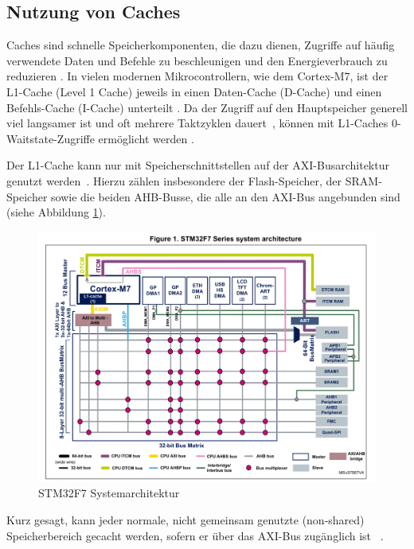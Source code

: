 \newpage


\subsection{Nutzung von Caches}

Caches sind schnelle Speicherkomponenten, die dazu dienen, Zugriffe auf häufig
verwendete Daten und Befehle zu beschleunigen und den Energieverbrauch zu
reduzieren \cite{ka001150}. In vielen modernen Mikrocontrollern, wie dem
Cortex-M7, ist der L1-Cache (Level 1 Cache) jeweils in einen Daten-Cache
(D-Cache) und einen Befehls-Cache (I-Cache) unterteilt \cite[S. 6]{an4667}. Da
der Zugriff auf den Hauptspeicher generell viel langsamer ist und oft mehrere
Taktzyklen dauert~\cite{stm32_memory_sections}, können mit L1-Caches
0-Waitstate-Zugriffe ermöglicht werden \cite[S. 6]{an4667}.

Der L1-Cache kann nur mit Speicherschnittstellen auf der \ac{AXI}-Busarchitektur
genutzt werden~\cite[S. 4]{an4839}. Hierzu zählen insbesondere der
Flash-Speicher, der SRAM-Speicher sowie die beiden \ac{AHB}-Busse, die alle an
den AXI-Bus angebunden sind (siehe Abbildung \ref{fig:m7_sys_arch}).

\begin{figure}[htb]
    \centering
    \includegraphics[width=1\textwidth]{assets/m7_system_arch}
    \caption{STM32F7 Systemarchitektur \cite[S. 9]{an4667}}
    \label{fig:m7_sys_arch}
\end{figure}

Kurz gesagt, kann jeder normale, nicht gemeinsam genutzte (non-shared)
Speicherbereich gecacht werden, sofern er über das AXI-Bus zugänglich ist
\cite[S. 4]{an4839}~\cite[S. 7]{an4667}.

